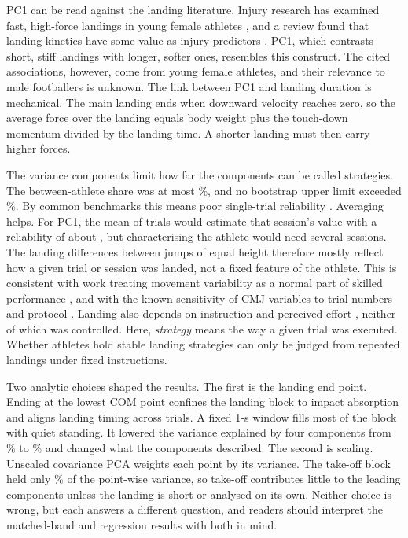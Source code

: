 PC1 can be read against the landing literature. Injury research has examined fast, high-force landings in young female athletes \parencite{leppanen2017}, and a review found that landing kinetics have some value as injury predictors \parencite{pedley2020}. PC1, which contrasts short, stiff landings with longer, softer ones, resembles this construct. The cited associations, however, come from young female athletes, and their relevance to male footballers is unknown. The link between PC1 and landing duration is mechanical. The main landing ends when downward velocity reaches zero, so the average force over the landing equals body weight plus the touch-down momentum divided by the landing time. A shorter landing must then carry higher forces.

The variance components limit how far the components can be called strategies. The between-athlete share was at most \betweenPCA\%, and no bootstrap upper limit exceeded \baCIMaxUpper\%. By common benchmarks this means poor single-trial reliability \parencite{koo2016}. Averaging helps. For PC1, the mean of \sbTrials{} trials would estimate that session's value with a reliability of about \sbPCA, but characterising the athlete would need several sessions. The landing differences between jumps of equal height therefore mostly reflect how a given trial or session was landed, not a fixed feature of the athlete. This is consistent with work treating movement variability as a normal part of skilled performance \parencite{davids2003,bartlett2007,preatoni2013}, and with the known sensitivity of CMJ variables to trial numbers and protocol \parencite{cormack2008,heishman2020}. Landing also depends on instruction and perceived effort \parencite{hite2025}, neither of which was controlled. Here, \emph{strategy} means the way a given trial was executed. Whether athletes hold stable landing strategies can only be judged from repeated landings under fixed instructions.

Two analytic choices shaped the results. The first is the landing end point. Ending at the lowest COM point confines the landing block to impact absorption and aligns landing timing across trials. A fixed 1-s window fills most of the block with quiet standing. It lowered the variance explained by four components from \cumFour\% to \cumFourS\% and changed what the components described. The second is scaling. Unscaled covariance PCA weights each point by its variance. The take-off block held only \varShareTakeoff\% of the point-wise variance, so take-off contributes little to the leading components unless the landing is short or analysed on its own. Neither choice is wrong, but each answers a different question, and readers should interpret the matched-band and regression results with both in mind.

